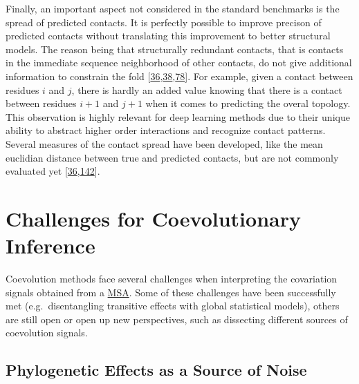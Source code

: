 \documentclass[11pt,a4paper,twoside]{book}
\theoremstyle{definition}
\theoremstyle{definition}
\theoremstyle{remark}
\begin{document}
Finally, an important aspect not considered in the standard benchmarks
is the spread of predicted contacts. It is perfectly possible to improve
precison of predicted contacts without translating this improvement to
better structural models. The reason being that structurally redundant
contacts, that is contacts in the immediate sequence neighborhood of
other contacts, do not give additional information to constrain the fold
{[}\protect\hyperlink{ref-Marks2011}{36},\protect\hyperlink{ref-Kim2014}{38},\protect\hyperlink{ref-Jones2015}{78}{]}.
For example, given a contact between residues \(i\) and \(j\), there is
hardly an added value knowing that there is a contact between residues
\(i\!+\!1\) and \(j\!+\!1\) when it comes to predicting the overal
topology. This observation is highly relevant for deep learning methods
due to their unique ability to abstract higher order interactions and
recognize contact patterns. Several measures of the contact spread have
been developed, like the mean euclidian distance between true and
predicted contacts, but are not commonly evaluated yet
{[}\protect\hyperlink{ref-Marks2011}{36},\protect\hyperlink{ref-DeOliveira2016}{142}{]}.

\section{Challenges for Coevolutionary Inference}\label{challenges}

Coevolution methods face several challenges when interpreting the
covariation signals obtained from a \protect\hyperlink{abbrev}{MSA}.
Some of these challenges have been successfully met (e.g.~disentangling
transitive effects with global statistical models), others are still
open or open up new perspectives, such as dissecting different sources
of coevolution signals.

\subsection{Phylogenetic Effects as a Source of
Noise}\label{phylogenetic-effects-as-a-source-of-noise}
\end{document}
